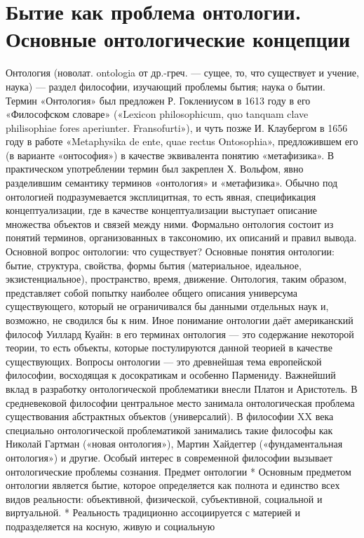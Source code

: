 \documentclass[12pt]{article}
\begin{document}
\section{Бытие как проблема онтологии. Основные онтологические концепции}
Онтология (новолат. ontologia от др.-греч. — сущее, то, что существует и учение, наука) — раздел философии,
изучающий проблемы бытия; наука о бытии.
Термин «Онтология» был предложен Р. Гоклениусом в 1613 году в его «Философском словаре» («Lexicon
philosophicum, quo tanquam clave philisophiae fores aperiunter. Fransofurti»), и чуть позже И. Клаубергом в 1656
году в работе «Metaphysika de ente, quae rectus Ontosophia», предложившем его (в варианте «онтософия») в
качестве  эквивалента  понятию  «метафизика».  В  практическом  употреблении  термин  был  закреплен  Х.
Вольфом, явно разделившим семантику терминов «онтология» и «метафизика».
Обычно под онтологией подразумевается эксплицитная, то есть явная, спецификация концептуализации, где в
качестве  концептуализации  выступает  описание  множества  объектов  и  связей  между  ними.  Формально
онтология состоит из понятий терминов, организованных в таксономию, их описаний и правил вывода.
Основной вопрос онтологии: что существует?
Основные  понятия  онтологии:  бытие,  структура,  свойства,  формы  бытия  (материальное,  идеальное,
экзистенциальное), пространство, время, движение.
Онтология,  таким  образом,  представляет  собой  попытку  наиболее  общего  описания  универсума
существующего, который не ограничивался бы данными отдельных наук и, возможно, не сводился бы к ним.
Иное понимание онтологии даёт американский философ Уиллард Куайн: в его терминах онтология — это
содержание  некоторой  теории,  то  есть  объекты,  которые  постулируются  данной  теорией  в  качестве
существующих.
Вопросы онтологии — это древнейшая тема европейской философии, восходящая к досократикам и особенно
Пармениду. Важнейший вклад в разработку онтологической проблематики внесли Платон и Аристотель. В
средневековой философии центральное место занимала онтологическая проблема существования абстрактных
объектов (универсалий).
В философии XX века специально онтологической проблематикой занимались такие философы как Николай
Гартман («новая онтология»), Мартин Хайдеггер («фундаментальная онтология») и другие. Особый интерес в
современной философии вызывает онтологические проблемы сознания.
Предмет онтологии
* Основным предметом онтологии является бытие, которое определяется как полнота и единство всех видов
реальности: объективной, физической, субъективной, социальной и виртуальной.
   * Реальность традиционно ассоциируется с материей и подразделяется на косную, живую и социальную
\end{document}
